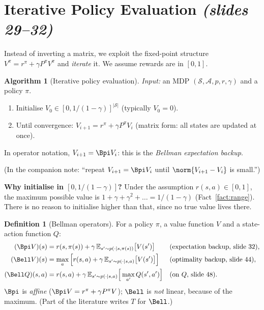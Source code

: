 \documentclass[11pt,a4paper]{article}
\newcommand{\E}{\mathbb{E}}
\newcommand{\slides}[1]{\emph{(slides #1)}}
\newcommand{\cS}{\mathcal{S}}
\newcommand{\cA}{\mathcal{A}}
\theoremstyle{plain}
\theoremstyle{definition}
\newtheorem{definition}[theorem]{Definition}
\newtheorem{algorithm}[theorem]{Algorithm}
\theoremstyle{remark}
\begin{document}
\section{Iterative Policy Evaluation \slides{29--32}}\label{sec:itpe}
Instead of inverting a matrix, we exploit the fixed-point structure $V^\pi=r^\pi+\gamma P^\pi V^\pi$ and \emph{iterate} it. We assume rewards are in $[0,1]$.

\begin{algorithm}[Iterative policy evaluation]\label{alg:pe}
\emph{Input:} an MDP $(\cS,\cA,p,r,\gamma)$ and a policy $\pi$.\par
\begin{enumerate}[label=\arabic*.,leftmargin=*]
  \item Initialise $V_0\in[0,1/(1-\gamma)]^{|\cS|}$ (typically $V_0=0$).
  \item Until convergence: $V_{i+1}=r^\pi+\gamma P^\pi V_i$ \quad (matrix form: all states are updated at once).
\end{enumerate}
In operator notation, $V_{i+1}=\Bpi V_i$: this is the \emph{Bellman expectation backup}.
\end{algorithm}
(In the companion note: ``repeat $V_{i+1}=\Bpi V_i$ until $\norm{V_{i+1}-V_i}$ is small.'')

\textbf{Why initialise in $[0,1/(1-\gamma)]$?} Under the assumption $r(s,a)\in[0,1]$, the maximum possible value is $1+\gamma+\gamma^2+\dots=1/(1-\gamma)$ (Fact~\ref{fact:range}). There is no reason to initialise higher than that, since no true value lives there.

\begin{definition}[Bellman operators]\label{def:bellman}
For a policy $\pi$, a value function $V$ and a state-action function $Q$:
\begin{align*}
(\Bpi V)(s)&=r(s,\pi(s))+\gamma\,\E_{s'\sim p(\cdot\mid s,\pi(s))}\big[V(s')\big] &&\text{(expectation backup, slide 32)},\\
(\Bell V)(s)&=\max_a\Big[r(s,a)+\gamma\,\E_{s'\sim p(\cdot\mid s,a)}\big[V(s')\big]\Big] &&\text{(optimality backup, slide 44)},\\
(\Bell Q)(s,a)&=r(s,a)+\gamma\,\E_{s'\sim p(\cdot\mid s,a)}\Big[\max_{a'}Q(s',a')\Big] &&\text{(on $Q$, slide 48)}.
\end{align*}
$\Bpi$ is \emph{affine} ($\Bpi V=r^\pi+\gamma P^\pi V$); $\Bell$ is \emph{not} linear, because of the maximum. (Part of the literature writes $T$ for $\Bell$.)
\end{definition}
\end{document}
